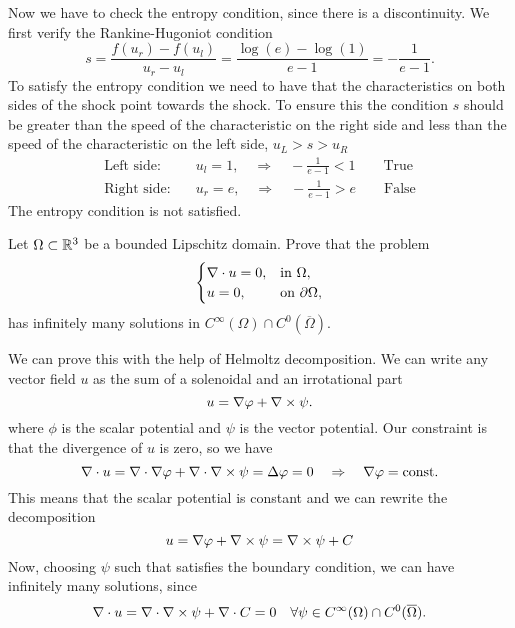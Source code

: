 \begin{itemize}
\begin{enumerate}
        Now we have to check the entropy condition, since there is a discontinuity. We first verify the Rankine-Hugoniot condition
        \[
            s = \frac{f(u_r) - f(u_l)}{u_r - u_l} = \frac{\log(e) - \log(1)}{e - 1} = -\frac{1}{e-1}.
        \]
        To satisfy the entropy condition we need to have that the characteristics on both sides of the shock point towards the shock. To ensure this the condition \(s\) should be greater than the speed of the characteristic on the right side and less than the speed of the characteristic on the left side, \(u_L > s > u_R\) 
        \[
            \begin{aligned}
                \text{Left side:} \quad & u_l = 1,  \quad \Rightarrow \quad -\frac{1}{e-1} < 1 \qquad \text{True} \\
                \text{Right side:} \quad & u_r = e,  \quad \Rightarrow \quad -\frac{1}{e-1} > e \qquad \text{False}
            \end{aligned}
        \]
        The entropy condition is not satisfied.
    \end{enumerate}
\end{itemize}

\newpage
\begin{exercise}
    Let \(\Omega \subset \mathbb{R}^3\) be a bounded Lipschitz domain. Prove that the problem
    \begin{equation*}
        \begin{cases}
            \nabla \cdot u = 0, & \text{in } \Omega, \\
            u  = 0, & \text{on } \partial \Omega,
        \end{cases}
    \end{equation*}
    has infinitely many solutions in \(C^\infty(\Omega) \cap C^0(\overline{\Omega})\).
\end{exercise}
We can prove this with the help of Helmoltz decomposition. We can write any vector field \(u\) as the sum of a solenoidal and an irrotational part
\[
    u = \nabla \varphi + \nabla \times \psi.
\]
where \(\phi\) is the scalar potential and \(\psi\) is the vector potential. Our constraint is that the divergence of \(u\) is zero, so we have
\[
    \nabla \cdot u = \nabla \cdot \nabla \varphi + \nabla \cdot \nabla \times \psi = \Delta \varphi = 0 \quad \Rightarrow \quad \nabla \varphi = \text{const.}
\]
This means that the scalar potential is constant and we can rewrite the decomposition
\[
    u = \nabla \varphi + \nabla \times \psi = \nabla \times \psi + C
\]
Now, choosing \(\psi\) such that satisfies the boundary condition, we can have infinitely many solutions, since 
\[
    \nabla \cdot u = \nabla \cdot \nabla \times \psi + \nabla \cdot C = 0 \quad \forall \psi \in  C^\infty(\Omega) \cap C^0(\overline{\Omega}).
\]

